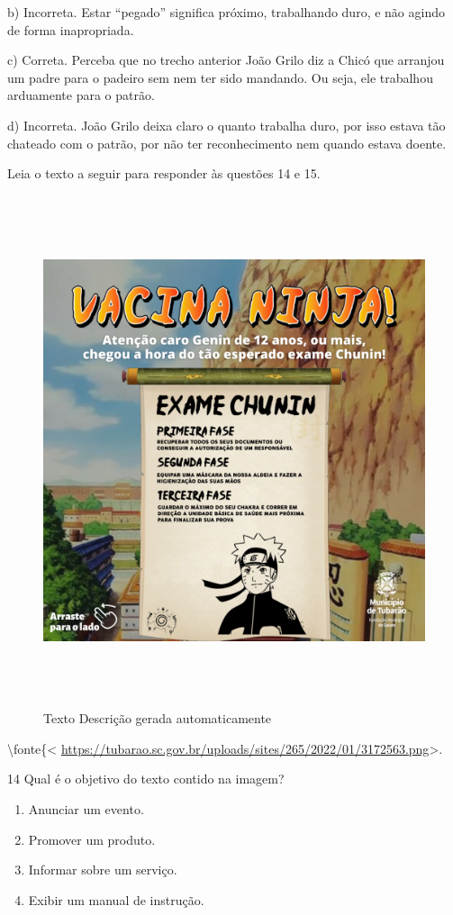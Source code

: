 {b) Incorreta. Estar ``pegado'' significa próximo, trabalhando duro, e
não agindo de forma inapropriada.

c) Correta. Perceba que no trecho anterior João Grilo diz a Chicó que
arranjou um padre para o padeiro sem nem ter sido mandando. Ou seja, ele
trabalhou arduamente para o patrão.

d) Incorreta. João Grilo deixa claro o quanto trabalha duro, por isso
estava tão chateado com o patrão, por não ter reconhecimento nem quando
estava doente.

Leia o texto a seguir para responder às questões 14 e 15.

\begin{figure}
\centering
\includegraphics[width=5.90556in,height=5.90556in]{./imgSAEB_6_POR/media/image51.png}
\caption{Texto Descrição gerada automaticamente}
\end{figure}

\textbackslash fonte\{\textless{}
\url{https://tubarao.sc.gov.br/uploads/sites/265/2022/01/3172563.png}\textgreater.

\num{14} Qual é o objetivo do texto contido na imagem?

\begin{enumerate}
\def\labelenumi{\alph{enumi})}
\item
  Anunciar um evento.
\item
  Promover um produto.
\item
  Informar sobre um serviço.
\item
  Exibir um manual de instrução.
\end{enumerate}

}
